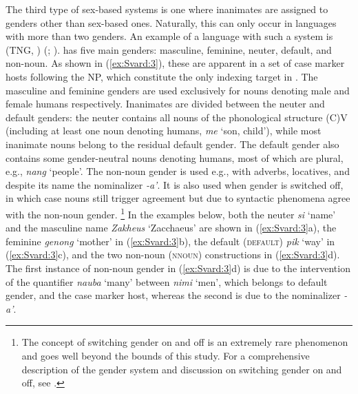 \documentclass[output=collectionpaper]{langsci/langscibook}
\begin{document}
The third type of sex-based systems is one where inanimates are assigned to genders other than sex-based ones. Naturally, this can only occur in languages with more than two genders. An example of a language with such a system is  (TNG, ) (\citealt{Svaerd2013}; \citealt{Waelchli2018}).  has five main genders: masculine, feminine, neuter, default, and non-noun. As shown in (\ref{ex:Svard:3}), these are apparent in a set of case marker hosts following the NP, which constitute the only indexing target in . The masculine and feminine genders are used exclusively for nouns denoting male and female humans respectively. Inanimates are divided between the neuter and default genders: the neuter contains all nouns of the phonological structure (C)V (including at least one noun denoting humans, \textit{me} `son, child'), while most inanimate nouns belong to the residual default gender. The default gender also contains some gender-neutral nouns denoting humans, most of which are plural, e.g., \textit{nang} `people'. The non-noun gender is used e.g., with adverbs, locatives, and despite its name the nominalizer \textit{-a'}. It is also used when gender is switched off, in which case nouns still trigger agreement but due to syntactic phenomena agree with the non-noun gender.%
\footnote{The concept of switching gender on and off is an extremely rare phenomenon and goes well beyond the bounds of this study. For a comprehensive description of the  gender system and discussion on switching gender on and off, see \citet{Waelchli2018}.} %
In the examples below, both the neuter \textit{si} `name' and the masculine name \textit{Zakheus} `Zacchaeus' are shown in (\ref{ex:Svard:3}a), the feminine \textit{genong} `mother' in (\ref{ex:Svard:3}b), the default (\textsc{default)} \textit{pik} `way' in (\ref{ex:Svard:3}c), and the two non-noun (\textsc{nnoun}) constructions in (\ref{ex:Svard:3}d). The first instance of non-noun gender in (\ref{ex:Svard:3}d) is due to the intervention of the quantifier \textit{nauba} `many' between \textit{nimi} `men', which belongs to default gender, and the case marker host, whereas the second is due to the nominalizer \textit{-a'}.
\end{document}
